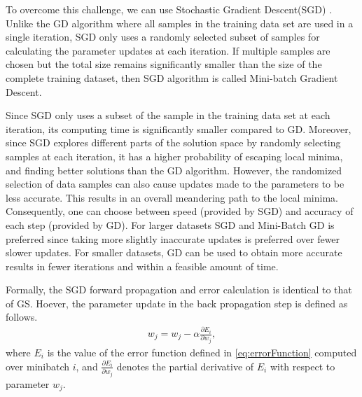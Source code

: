 \documentclass[conference]{IEEEtran}
\begin{document}
To overcome this challenge, we can use Stochastic Gradient Descent(SGD) \cite{bottou2010large}. 
Unlike the GD algorithm where all samples in the training data set are used in a single iteration, SGD only uses a randomly
selected subset of samples for calculating the parameter updates at each iteration. 
If multiple samples are chosen but the total size remains significantly smaller than the size of the complete
training dataset, then SGD algorithm is called Mini-batch Gradient Descent.


Since SGD only uses a subset of the sample in the training data set at each iteration, its computing time is
significantly smaller compared to GD.  Moreover, since SGD explores different parts of the solution space by randomly selecting samples
at each iteration, it has a higher probability of escaping local minima, and finding better solutions than the GD algorithm. 
However, the randomized selection of data samples can also cause updates made to the parameters to be less accurate. This results in an
overall meandering path to the local minima. Consequently, one can choose between speed (provided by SGD) and accuracy of each step 
(provided by GD). For larger datasets SGD and Mini-Batch GD is preferred since taking more slightly inaccurate updates is preferred
over fewer slower updates. For smaller datasets, GD can be used to obtain more accurate results in fewer iterations and
within a feasible amount of time. 

Formally, the SGD forward propagation and error calculation is identical to that of GS. Hoever, the parameter update in the 
back propagation step is defined as follows.
\begin{align}\label{eq:SGD}
w_j = w_j -\alpha \frac{\partial E_i}{\partial w_j}, 
\end{align}
where $E_i$ is the value of the error function defined in \ref{eq:errorFunction} computed over
minibatch $i$, and  $\frac{\partial E_i}{\partial w_j}$ denotes the partial derivative of $E_i$ with respect to parameter $w_j$. 
 
\end{document}
